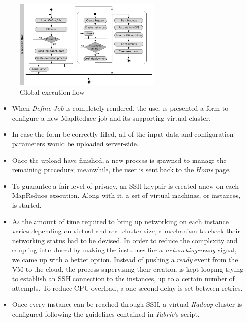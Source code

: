 \documentclass{sig-alternate}
\begin{document}
\begin{figure}[htb]
\centering
\includegraphics[width=0.65\textwidth]{img/006}
\caption{Global execution flow}
\label{fig:exflow}
\end{figure}

\begin{itemize}
 \item When \emph{Define Job} is completely rendered, the user is presented a form to configure a new MapReduce job and its supporting virtual cluster.
 
 \item In case the form be correctly filled, all of the input data and configuration parameters would be uploaded server-side.
 
 \item Once the upload have finished, a new process is spawned to manage the remaining procedure; meanwhile, the user is sent back to the \emph{Home} page.
 
 \item To guarantee a fair level of privacy, an SSH keypair is created anew on each MapReduce execution. Along with it, a set of virtual machines, or instances, is started.
 
 \item As the amount of time required to bring up networking on each instance varies depending on virtual and real cluster size, a mechanism to check their networking status had to be devised. In order to reduce the complexity and coupling introduced by making the instances fire a \emph{networking-ready} signal, we came up with a better option. Instead of pushing a \emph{ready} event from the VM to the cloud, the process supervising their creation is kept looping trying to establish an SSH connection to the instances, up to a certain number of attempts. To reduce CPU overload, a one second delay is set between retries.
 
 \item Once every instance can be reached through SSH, a virtual \emph{Hadoop} cluster is configured following the guidelines contained in \emph{Fabric}'s script.
 

\end{itemize}
\end{document}
